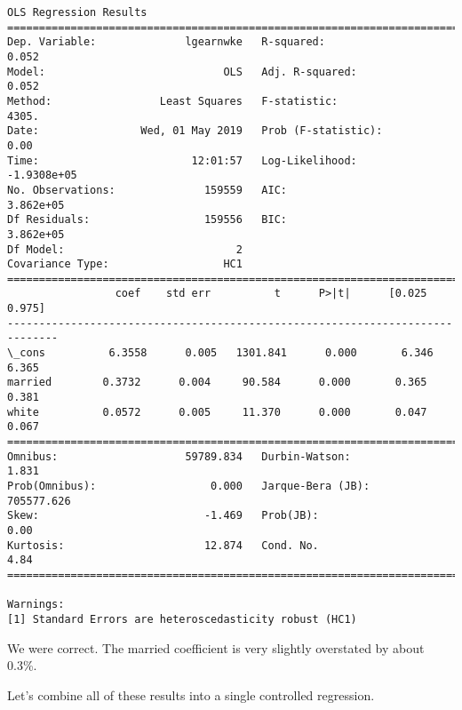 \documentclass[11pt]{article}
\begin{document}
    \begin{Verbatim}[commandchars=\\\{\}]
                            OLS Regression Results                            
==============================================================================
Dep. Variable:              lgearnwke   R-squared:                       0.052
Model:                            OLS   Adj. R-squared:                  0.052
Method:                 Least Squares   F-statistic:                     4305.
Date:                Wed, 01 May 2019   Prob (F-statistic):               0.00
Time:                        12:01:57   Log-Likelihood:            -1.9308e+05
No. Observations:              159559   AIC:                         3.862e+05
Df Residuals:                  159556   BIC:                         3.862e+05
Df Model:                           2                                         
Covariance Type:                  HC1                                         
==============================================================================
                 coef    std err          t      P>|t|      [0.025      0.975]
------------------------------------------------------------------------------
\_cons          6.3558      0.005   1301.841      0.000       6.346       6.365
married        0.3732      0.004     90.584      0.000       0.365       0.381
white          0.0572      0.005     11.370      0.000       0.047       0.067
==============================================================================
Omnibus:                    59789.834   Durbin-Watson:                   1.831
Prob(Omnibus):                  0.000   Jarque-Bera (JB):           705577.626
Skew:                          -1.469   Prob(JB):                         0.00
Kurtosis:                      12.874   Cond. No.                         4.84
==============================================================================

Warnings:
[1] Standard Errors are heteroscedasticity robust (HC1)

    \end{Verbatim}

    We were correct. The married coefficient is very slightly overstated by
about 0.3\%.

Let's combine all of these results into a single controlled regression.
\end{document}

